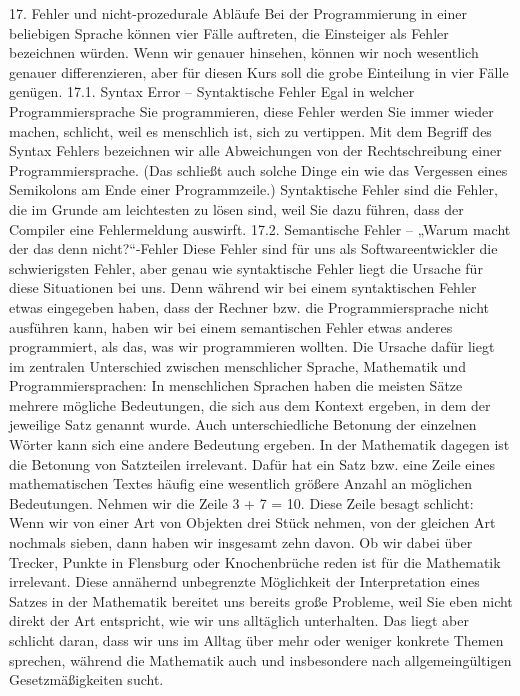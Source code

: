 17.	Fehler und nicht-prozedurale Abläufe
Bei der Programmierung in einer beliebigen Sprache können vier Fälle auftreten, die Einsteiger als Fehler bezeichnen würden. Wenn wir genauer hinsehen, können wir noch wesentlich genauer differenzieren, aber für diesen Kurs soll die grobe Einteilung in vier Fälle genügen.
17.1.	Syntax Error – Syntaktische Fehler
Egal in welcher Programmiersprache Sie programmieren, diese Fehler werden Sie immer wieder machen, schlicht, weil es menschlich ist, sich zu vertippen. Mit dem Begriff des Syntax Fehlers bezeichnen wir alle Abweichungen von der Rechtschreibung einer Programmiersprache. (Das schließt auch solche Dinge ein wie das Vergessen eines Semikolons am Ende einer Programmzeile.)
Syntaktische Fehler sind die Fehler, die im Grunde am leichtesten zu lösen sind, weil Sie dazu führen, dass der Compiler eine Fehlermeldung auswirft.
17.2.	Semantische Fehler – „Warum macht der das denn nicht?“-Fehler
Diese Fehler sind für uns als Softwareentwickler die schwierigsten Fehler, aber genau wie syntaktische Fehler liegt die Ursache für diese Situationen bei uns.
Denn während wir bei einem syntaktischen Fehler etwas eingegeben haben, dass der Rechner bzw. die Programmiersprache nicht ausführen kann, haben wir bei einem semantischen Fehler etwas anderes programmiert, als das, was wir programmieren wollten.
Die Ursache dafür liegt im zentralen Unterschied zwischen menschlicher Sprache, Mathematik und Programmiersprachen:
In menschlichen Sprachen haben die meisten Sätze mehrere mögliche Bedeutungen, die sich aus dem Kontext ergeben, in dem der jeweilige Satz genannt wurde. Auch unterschiedliche Betonung der einzelnen Wörter kann sich eine andere Bedeutung ergeben.
In der Mathematik dagegen ist die Betonung von Satzteilen irrelevant. Dafür hat ein Satz bzw. eine Zeile eines mathematischen Textes häufig eine wesentlich größere Anzahl an möglichen Bedeutungen. Nehmen wir die Zeile 3 + 7 = 10. Diese Zeile besagt schlicht: Wenn wir von einer Art von Objekten drei Stück nehmen, von der gleichen Art nochmals sieben, dann haben wir insgesamt zehn davon. Ob wir dabei über Trecker, Punkte in Flensburg oder Knochenbrüche reden ist für die Mathematik irrelevant. Diese annähernd unbegrenzte Möglichkeit der Interpretation eines Satzes in der Mathematik bereitet uns bereits große Probleme, weil Sie eben nicht direkt der Art entspricht, wie wir uns alltäglich unterhalten. Das liegt aber schlicht daran, dass wir uns im Alltag über mehr oder weniger konkrete Themen sprechen, während die Mathematik auch und insbesondere nach allgemeingültigen Gesetzmäßigkeiten sucht.
